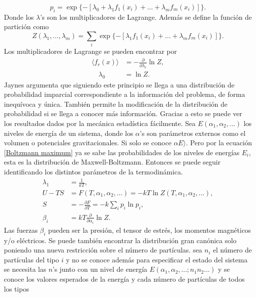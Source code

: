 \begin{equation} \label{Boltzmann maximum}
p_{i}= \exp \{ -[\lambda_{0}+ \lambda_{1}f_{1}(x_{i})+...+\lambda_{m} f_{m}(x_{i})] \}.
\end{equation}
Donde los $\lambda$'s son los multiplicadores de Lagrange. Además se define la función de partición como
\begin{equation}
Z(\lambda_{1},...,\lambda_{m})=\sum_{i} \exp \{ -[ \lambda_{1}f_{1}(x_{i})+...+\lambda_{m} f_{m}(x_{i})] \}.
\end{equation}
Los multiplicadores de Lagrange se pueden encontrar por
\begin{align*}
\langle f_{r}(x) \rangle  &= - \frac{\partial}{\partial \lambda_{r}} \ln Z, \\
\quad \lambda_{0} &= \ln Z.
\end{align*}
Jaynes argumenta que siguiendo este principio se llega a una distribución de probabilidad imparcial correspondiente a la información del problema, de forma inequívoca y única. También permite la modificación de la distribución de probabilidad si se llega a conocer más información. Gracias a esto se puede ver los resultados dados por la mecánica estadística fácilmente. Sea $E(\alpha_{1},\alpha_{2},...)$ los niveles de energía de un sistema, donde los $\alpha$'s son parámetros externos como el volumen o potenciales gravitacionales. Si solo se conoce $\alpha E \rangle $. Pero por la ecuación \ref{Boltzmann maximum} ya se sabe las probabilidades de los niveles de energías $E_{i}$, esta es la distribución de Maxwell-Boltzmann. Entonces se puede seguir identificando los distintos parámetros de la termodinámica.
\begin{align*}
\lambda_{1} &=\frac{1}{kT}, \\
U-TS &= F(T,\alpha_{1},\alpha_{2},...)=-kT \ln Z(T,\alpha_{1},\alpha_{2},...), \\
S &= -\frac{\partial F}{\partial T}=-k\sum_{i} p_{i} \ln p_{i}, \\
\beta_{i} &= kT \frac{\partial }{\partial \alpha_{i}} \ln Z.
\end{align*}
Las fuerzas $\beta_{i}$ pueden ser la presión, el tensor de estrés, los momentos magnéticos y/o  eléctricos. Se puede también encontrar la distribución gran canónica solo poniendo una nueva restricción sobre el número de partículas. sea $n_{i}$ el número de partículas del tipo $i$ y no se conoce además para especificar el estado del sistema se necesita las $n$'s junto con un nivel de energía $E(\alpha_{1},\alpha_{2},...;n_{1}n_{2}...)$ y se conoce los valores esperados de la energía y cada número de partículas de todos los tipos
